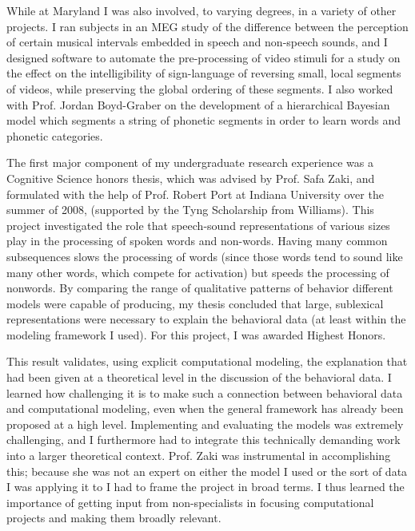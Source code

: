 \documentclass[12pt]{article}
\begin{document}
While at Maryland I was also involved, to varying degrees, in a variety of other projects.  I ran subjects in an MEG study of the difference between the perception of certain musical intervals embedded in speech and non-speech sounds, and I designed software to automate the pre-processing of video stimuli for a study on the effect on the intelligibility of sign-language of reversing small, local segments of videos, while preserving the global ordering of these segments.  I also worked with Prof. Jordan Boyd-Graber on the development of a hierarchical Bayesian model which segments a string of phonetic segments in order to learn words and phonetic categories.

The first major component of my undergraduate research experience was a Cognitive Science honors thesis, which was advised by Prof. Safa Zaki, and formulated with the help of Prof. Robert Port at Indiana University over the summer of 2008, (supported by the Tyng Scholarship from Williams).  This project investigated the role that speech-sound representations of various sizes play in the processing of spoken words and non-words.  Having many common subsequences slows the processing of words (since those words tend to sound like many other words, which compete for activation) but speeds the processing of nonwords.  By comparing the range of qualitative patterns of behavior different models were capable of producing, my thesis concluded that large, sublexical representations were necessary to explain the behavioral data (at least within the modeling framework I used).  For this project, I was awarded Highest Honors.

This result validates, using explicit computational modeling, the explanation that had been given at a theoretical level in the discussion of the behavioral data.  I learned how challenging it is to make such a connection between behavioral data and computational modeling, even when the general framework has already been proposed at a high level.  Implementing and evaluating the models was extremely challenging, and I furthermore had to integrate this technically demanding work into a larger theoretical context.  Prof. Zaki was instrumental in accomplishing this; because she was not an expert on either the model I used or the sort of data I was applying it to I had to frame the project in broad terms.  I thus learned the importance of getting input from non-specialists in focusing computational projects and making them broadly relevant.
\end{document}
